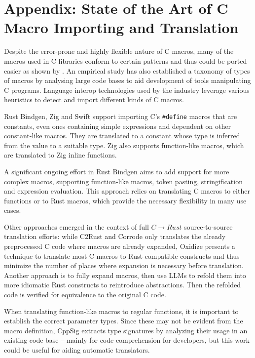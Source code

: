 \section{Appendix: State of the Art of C Macro Importing and Translation}
\label{app:macro}
Despite the error-prone and highly flexible nature of C macros, many of the macros used in C libraries conform to certain patterns and thus could be ported easier as shown by \cite{Pappas_2024}. An empirical study has also established a taxonomy of types of macros by analysing large code bases\cite{usage-of-macros-study} to aid development of tools manipulating C programs. Language interop technologies used by the industry leverage various heuristics to detect and import different kinds of C macros.

Rust Bindgen, Zig and Swift support importing C's \texttt{\#define} macros that are constants, even ones containing simple expressions and dependent on other constant-like macros. They are translated to a constant whose type is inferred from the value to a suitable type. Zig also supports function-like macros, which are translated to Zig inline functions.

A significant ongoing effort in Rust Bindgen aims to add support for more complex macros, supporting function-like macros, token pasting, stringification and expression evaluation\cite{bindgen-cmacro-rs}. This approach relies on translating C macros to either functions or to Rust macros, which provide the necessary flexibility in many use cases.

Other approaches emerged in the context of full $C \rightarrow Rust$ source-to-source translation efforts: while C2Rust \cite{c2rust} and Corrode\cite{corrode} only translates the already preprocessed C code where macros are already expanded, Oxidize\cite{oxidize-wip} presents a technique to translate most C macros to Rust-compatible constructs and thus minimize the number of places where expansion is necessary before translation. Another approach is to fully expand macros, then use LLMs to refold them into more idiomatic Rust constructs to reintroduce abstractions. Then the refolded code is verified for equivalence to the original C code\cite{rust-macro-refolding}.

When translating function-like macros to regular functions, it is important to establish the correct parameter types. Since these may not be evident from the macro definition, CppSig\cite{cppsig} extracts type signatures by analyzing their usage in an existing code base -- mainly for code comprehension for developers, but this work could be useful for aiding automatic translators.



